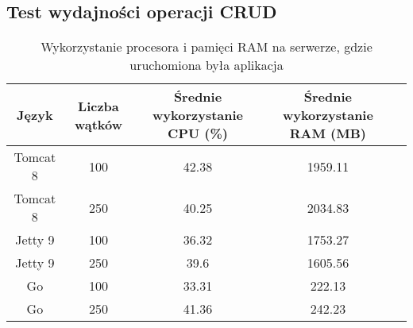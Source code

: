  \newpage
 \subsection{Test wydajności operacji CRUD}

 \clearpage

\begin{table}[!htb]
\centering
\caption{Wykorzystanie procesora i pamięci RAM na serwerze, gdzie uruchomiona była aplikacja}
\label{tab:app-clean-crud}
\begin{tabular}{@{}ccccl@{}}
\toprule
\textbf{Język} & \textbf{Liczba wątków} & \multicolumn{1}{p{3cm}}{\textbf{Średnie wykorzystanie CPU (\%)}} & \multicolumn{1}{p{3cm}}{\textbf{Średnie wykorzystanie RAM (MB)}} &  \\ \midrule
Tomcat 8       & 100                    & 42.38                             & 1959.11                          &  \\
Tomcat 8       & 250                    & 40.25                             & 2034.83                          &  \\
Jetty 9       & 100                    & 36.32                             & 1753.27                          &  \\
Jetty 9       & 250                    & 39.6                             & 1605.56                          &  \\
Go       & 100                    & 33.31                             & 222.13                          &  \\
Go       & 250                    & 41.36                             & 242.23                          &  \\
\bottomrule
\end{tabular}
\end{table}


